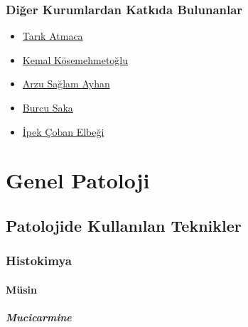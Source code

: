 \documentclass[
  letterpaper,
  DIV=11,
  numbers=noendperiod]{scrreprt}
\begin{document}
\hypertarget{sec-diger-kurumlardan-katkida-bulunanlar}{%
\section*{Diğer Kurumlardan Katkıda
Bulunanlar}\label{sec-diger-kurumlardan-katkida-bulunanlar}}


\begin{itemize}
\item
  \href{https://github.com/veterinarypathology3d}{Tarık Atmaca}
\item
  \href{https://hacettepepathology.com/}{Kemal Kösemehmetoğlu}
\item
  \href{https://www.hastane.hacettepe.edu.tr/115.html?drid=479}{Arzu
  Sağlam Ayhan}
\item
  \href{https://scholar.google.com.tr/citations?user=9e7r9yQAAAAJ}{Burcu
  Saka}
\item
  \href{https://www.florence.com.tr/prof-dr-ipek-coban-elbegi}{İpek
  Çoban Elbeği}
\end{itemize}

\part{Genel Patoloji}

\hypertarget{sec-patolojide-kullanilan-teknikler}{%
\chapter{Patolojide Kullanılan
Teknikler}\label{sec-patolojide-kullanilan-teknikler}}

\hypertarget{sec-histokimya}{%
\section{Histokimya}\label{sec-histokimya}}

\hypertarget{sec-musin}{%
\subsection{Müsin}\label{sec-musin}}

\hypertarget{sec-mucicarmine}{%
\subsubsection{Mucicarmine}\label{sec-mucicarmine}}
\end{document}
